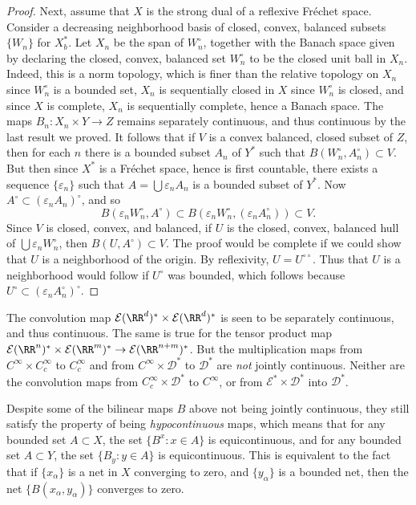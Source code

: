 \begin{proof}
    Next, assume that $X$ is the strong dual of a reflexive Fr\'{e}chet space. Consider a decreasing neighborhood basis of closed, convex, balanced subsets $\{ W_n \}$ for $X^*_b$. Let $X_n$ be the span of $W_n^\circ$, together with the Banach space given by declaring the closed, convex, balanced set $W_n^\circ$ to be the closed unit ball in $X_n$. Indeed, this is a norm topology, which is finer than the relative topology on $X_n$ since $W_n^\circ$ is a bounded set, $X_n$ is sequentially closed in $X$ since $W_n^\circ$ is closed, and since $X$ is complete, $X_n$ is sequentially complete, hence a Banach space. The maps $B_n: X_n \times Y \to Z$ remains separately continuous, and thus continuous by the last result we proved. It follows that if $V$ is a convex balanced, closed subset of $Z$, then for each $n$ there is a bounded subset $A_n$ of $Y^*$ such that $B(W_n^\circ, A_n^\circ) \subset V$. But then since $X^*$ is a Fr\'{e}chet space, hence is first countable, there exists a sequence $\{ \varepsilon_n \}$ such that $A = \bigcup \varepsilon_n A_n$ is a bounded subset of $Y^*$. Now $A^\circ \subset (\varepsilon_n A_n)^\circ$, and so
    \[ B(\varepsilon_n W_n^\circ, A^\circ) \subset B(\varepsilon_n W_n^\circ, (\varepsilon_n A_n^\circ)) \subset V. \]
    Since $V$ is closed, convex, and balanced, if $U$ is the closed, convex, balanced hull of $\bigcup \varepsilon_n W_n^\circ$, then $B(U,A^\circ) \subset V$. The proof would be complete if we could show that $U$ is a neighborhood of the origin. By reflexivity, $U = U^{\circ \circ}$. Thus that $U$ is a neighborhood would follow if $U^\circ$ was bounded, which follows because $U^\circ \subset (\varepsilon_n A_n^\circ)^\circ$.
\end{proof}

\begin{example}
    The convolution map $\mathcal{E}(\RR^d)^* \times \mathcal{E}(\RR^d)^*$ is seen to be separately continuous, and thus continuous. The same is true for the tensor product map $\mathcal{E}(\RR^n)^* \times \mathcal{E}(\RR^m)^* \to \mathcal{E}(\RR^{n + m})^*$. But the multiplication maps from $C^\infty \times C_c^\infty$ to $C_c^\infty$ and from $C^\infty \times \mathcal{D}^*$ to $\mathcal{D}^*$ are \emph{not} jointly continuous. Neither are the convolution maps from $C_c^\infty \times \mathcal{D}^*$ to $C^\infty$, or from $\mathcal{E}^* \times \mathcal{D}^*$ into $\mathcal{D}^*$.
\end{example}

Despite some of the bilinear maps $B$ above not being jointly continuous, they still satisfy the property of being \emph{hypocontinuous} maps, which means that for any bounded set $A \subset X$, the set $\{ B^x: x \in A \}$ is equicontinuous, and for any bounded set $A \subset Y$, the set $\{ B_y : y \in A \}$ is equicontinuous. This is equivalent to the fact that if $\{ x_\alpha \}$ is a net in $X$ converging to zero, and $\{ y_\alpha \}$ is a bounded net, then the net $\{ B(x_\alpha,y_\alpha) \}$ converges to zero.

